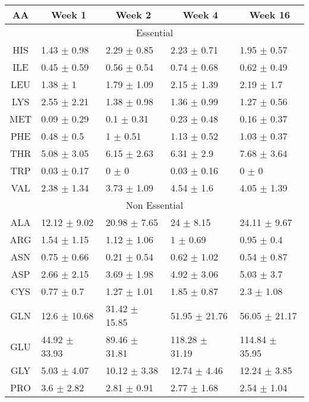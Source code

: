 \begin{table}[ht]
  \setlength{\tabcolsep}{12pt}
  \begin{tabular}{cllll}
  AA & \multicolumn{1}{c}{Week 1} & \multicolumn{1}{c}{Week 2} & \multicolumn{1}{c}{Week 4} & \multicolumn{1}{c}{Week 16} \\
  \hline
  \multicolumn{5}{c}{Essential} \\
  \hline
  HIS & 1.43 $\pm$ 0.98 & 2.29 $\pm$ 0.85 & 2.23 $\pm$ 0.71 & 1.95 $\pm$ 0.57 \\
  ILE & 0.45 $\pm$ 0.59 & 0.56 $\pm$ 0.54 & 0.74 $\pm$ 0.68 & 0.62 $\pm$ 0.49 \\
  LEU & 1.38 $\pm$ 1 & 1.79 $\pm$ 1.09 & 2.15 $\pm$ 1.39 & 2.19 $\pm$ 1.7 \\
  LYS & 2.55 $\pm$ 2.21 & 1.38 $\pm$ 0.98 & 1.36 $\pm$ 0.99 & 1.27 $\pm$ 0.56 \\
  MET & 0.09 $\pm$ 0.29 & 0.1 $\pm$ 0.31 & 0.23 $\pm$ 0.48 & 0.16 $\pm$ 0.37 \\
  PHE & 0.48 $\pm$ 0.5 & 1 $\pm$ 0.51 & 1.13 $\pm$ 0.52 & 1.03 $\pm$ 0.37 \\
  THR & 5.08 $\pm$ 3.05 & 6.15 $\pm$ 2.63 & 6.31 $\pm$ 2.9 & 7.68 $\pm$ 3.64 \\
  TRP & 0.03 $\pm$ 0.17 & 0 $\pm$ 0 & 0.03 $\pm$ 0.16 & 0 $\pm$ 0 \\
  VAL & 2.38 $\pm$ 1.34 & 3.73 $\pm$ 1.09 & 4.54 $\pm$ 1.6 & 4.05 $\pm$ 1.39 \\
  \hline
  \multicolumn{5}{c}{Non Essential} \\
  \hline
  ALA & 12.12 $\pm$ 9.02 & 20.98 $\pm$ 7.65 & 24 $\pm$ 8.15 & 24.11 $\pm$ 9.67 \\
  ARG & 1.54 $\pm$ 1.15 & 1.12 $\pm$ 1.06 & 1 $\pm$ 0.69 & 0.95 $\pm$ 0.4 \\
  ASN & 0.75 $\pm$ 0.66 & 0.21 $\pm$ 0.54 & 0.62 $\pm$ 1.02 & 0.54 $\pm$ 0.87 \\
  ASP & 2.66 $\pm$ 2.15 & 3.69 $\pm$ 1.98 & 4.92 $\pm$ 3.06 & 5.03 $\pm$ 3.7 \\
  CYS & 0.77 $\pm$ 0.7 & 1.27 $\pm$ 1.01 & 1.85 $\pm$ 0.87 & 2.3 $\pm$ 1.08 \\
  GLN & 12.6 $\pm$ 10.68 & 31.42 $\pm$ 15.85 & 51.95 $\pm$ 21.76 & 56.05 $\pm$ 21.17 \\
  GLU & 44.92 $\pm$ 33.93 & 89.46 $\pm$ 31.81 & 118.28 $\pm$ 31.19 & 114.84 $\pm$ 35.95 \\
  GLY & 5.03 $\pm$ 4.07 & 10.12 $\pm$ 3.38 & 12.74 $\pm$ 4.46 & 12.24 $\pm$ 3.85 \\
  PRO & 3.6 $\pm$ 2.82 & 2.81 $\pm$ 0.91 & 2.77 $\pm$ 1.68 & 2.54 $\pm$ 1.04 \\

\end{tabular}
\end{table}
